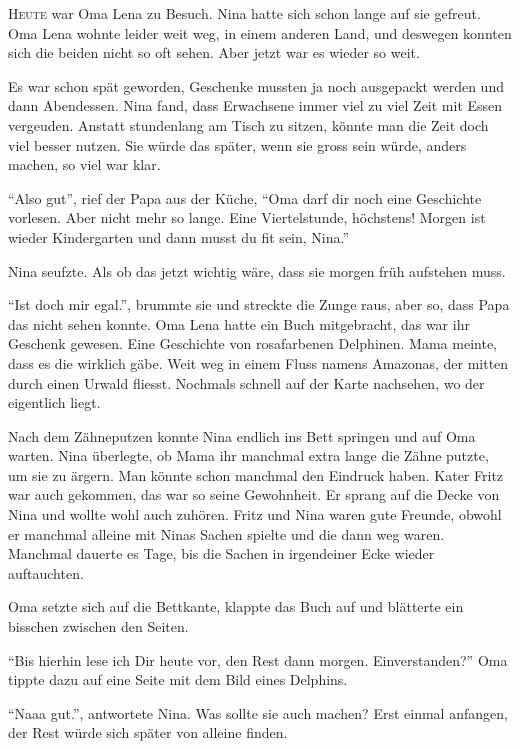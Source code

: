 \begin{mdframed}[style=mystyle]
\lettrine[lines=3]{\color{red}H}{eute} war Oma Lena zu Besuch. Nina hatte sich schon lange auf sie gefreut. Oma Lena wohnte leider weit weg, in einem anderen Land, und deswegen konnten sich die beiden nicht so oft sehen. Aber jetzt war es wieder so weit. 

Es war schon spät geworden, Geschenke mussten ja noch ausgepackt werden und dann Abendessen. Nina fand, dass Erwachsene immer viel zu viel Zeit mit Essen vergeuden. Anstatt stundenlang am Tisch zu sitzen, könnte man die Zeit doch viel besser nutzen. Sie würde das später, wenn sie gross sein würde, anders machen, so viel war klar.

\enquote{Also gut}, rief der Papa aus der Küche, \enquote{Oma darf dir noch eine Geschichte vorlesen. Aber nicht mehr so lange. Eine Viertelstunde, höchstens! Morgen ist wieder Kindergarten und dann musst du fit sein, Nina.}

Nina seufzte. Als ob das jetzt wichtig wäre, dass sie morgen früh aufstehen muss. 

\enquote{Ist doch mir egal.}, brummte sie und streckte die Zunge raus, aber so, dass Papa das nicht sehen konnte. Oma Lena hatte ein Buch mitgebracht, das war ihr Geschenk gewesen. Eine Geschichte von rosafarbenen Delphinen. Mama meinte, dass es die wirklich gäbe. Weit weg in einem Fluss namens Amazonas, der mitten durch einen Urwald fliesst. Nochmals schnell auf der Karte nachsehen, wo der eigentlich liegt.

Nach dem Zähneputzen konnte Nina endlich ins Bett springen und auf Oma warten. Nina überlegte, ob Mama ihr manchmal extra lange die Zähne putzte, um sie zu ärgern. Man könnte schon manchmal den Eindruck haben. Kater Fritz war auch gekommen, das war so seine Gewohnheit. Er sprang auf die Decke von Nina und wollte wohl auch zuhören. Fritz und Nina waren gute Freunde, obwohl er manchmal alleine mit Ninas Sachen spielte und die dann weg waren. Manchmal dauerte es Tage, bis die Sachen in irgendeiner Ecke wieder auftauchten. 

Oma setzte sich auf die Bettkante, klappte das Buch auf und blätterte ein bisschen zwischen den Seiten.

\enquote{Bis hierhin lese ich Dir heute vor, den Rest dann morgen. Einverstanden?} Oma tippte dazu auf eine Seite mit dem Bild eines Delphins. 

\enquote{Naaa gut.}, antwortete Nina. Was sollte sie auch machen? Erst einmal anfangen, der Rest würde sich später von alleine finden.
\end{mdframed}\medskip

